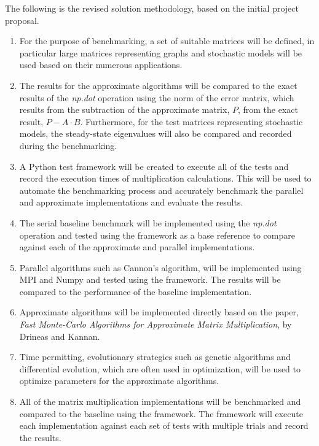 \documentclass[oneside]{article}
\begin{document}
The following is the revised solution methodology, based on the initial project proposal.

\begin{enumerate}
\item For the purpose of benchmarking, a set of suitable matrices will be defined, in particular large matrices representing graphs and stochastic models will be used based on their numerous applications\cite{yegnanarayanan2013application}.

\item The results for the approximate algorithms will be compared to the exact results of the \emph{np.dot} operation using the norm of the error matrix, which results from the subtraction of the approximate matrix, $P$, from the exact result, $P - A \cdot B$\cite{drineas2001fast}. Furthermore, for the test matrices representing stochastic models, the steady-state eigenvalues will also be compared and recorded during the benchmarking.

\item A Python test framework will be created to execute all of the tests and record the execution times of multiplication calculations. This will be used to automate the benchmarking process and  accurately benchmark the parallel and approximate implementations and evaluate the results.

\item The serial baseline benchmark will be implemented using the \emph{np.dot} operation and tested using the framework as a base reference to compare against each of the approximate and parallel implementations.

\item Parallel algorithms such as Cannon's algorithm\cite{lee1997generalized}, will be implemented using MPI and Numpy and tested using the framework. The results will be compared to the performance of the baseline implementation.

\item Approximate algorithms will be implemented directly based on the paper, \emph{Fast Monte-Carlo Algorithms for Approximate Matrix Multiplication}\cite{drineas2001fast}, by Drineas and Kannan.

\item Time permitting, evolutionary strategies such as genetic algorithms and differential evolution, which are often used in optimization\cite{de1989using}, will be used to optimize parameters for the approximate algorithms.

\item All of the matrix multiplication implementations will be benchmarked and compared to the baseline using the framework. The framework will execute each implementation against each set of tests with multiple trials and record the results.
\end{enumerate}
\end{document}
